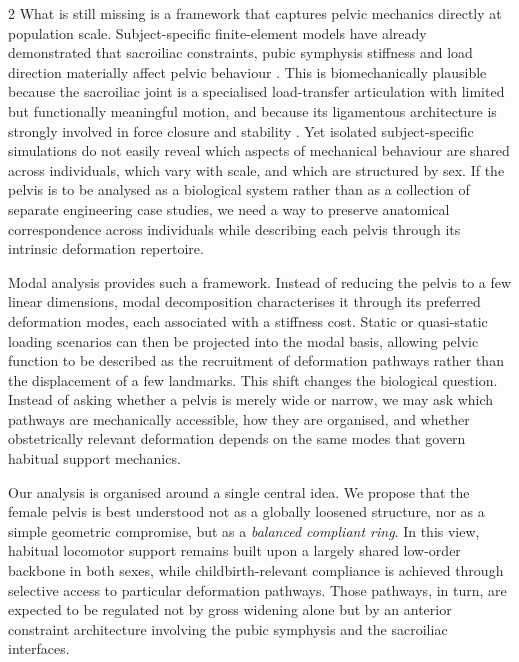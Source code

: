 \documentclass[openacc]{rsproca_new}
\begin{document}
\begin{multicols}{2}
What is still missing is a framework that captures pelvic mechanics directly at population scale. Subject-specific finite-element models have already demonstrated that sacroiliac constraints, pubic symphysis stiffness and load direction materially affect pelvic behaviour \cite{Eichenseer2011,Hammer2013}. This is biomechanically plausible because the sacroiliac joint is a specialised load-transfer articulation with limited but functionally meaningful motion, and because its ligamentous architecture is strongly involved in force closure and stability \cite{Vleeming2012,Kiapour2019,ChoKwak2020}. Yet isolated subject-specific simulations do not easily reveal which aspects of mechanical behaviour are shared across individuals, which vary with scale, and which are structured by sex. If the pelvis is to be analysed as a biological system rather than as a collection of separate engineering case studies, we need a way to preserve anatomical correspondence across individuals while describing each pelvis through its intrinsic deformation repertoire.

Modal analysis provides such a framework. Instead of reducing the pelvis to a few linear dimensions, modal decomposition characterises it through its preferred deformation modes, each associated with a stiffness cost. Static or quasi-static loading scenarios can then be projected into the modal basis, allowing pelvic function to be described as the recruitment of deformation pathways rather than the displacement of a few landmarks. This shift changes the biological question. Instead of asking whether a pelvis is merely wide or narrow, we may ask which pathways are mechanically accessible, how they are organised, and whether obstetrically relevant deformation depends on the same modes that govern habitual support mechanics.

Our analysis is organised around a single central idea. We propose that the female pelvis is best understood not as a globally loosened structure, nor as a simple geometric compromise, but as a \emph{balanced compliant ring}. In this view, habitual locomotor support remains built upon a largely shared low-order backbone in both sexes, while childbirth-relevant compliance is achieved through selective access to particular deformation pathways. Those pathways, in turn, are expected to be regulated not by gross widening alone but by an anterior constraint architecture involving the pubic symphysis and the sacroiliac interfaces.


\end{multicols}
\end{document}
